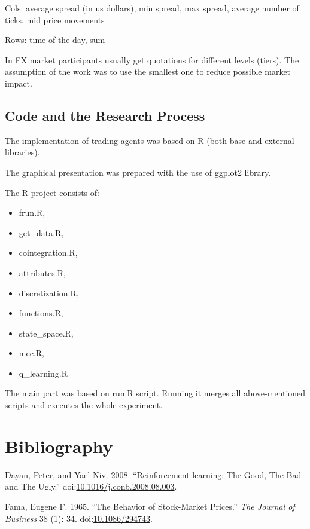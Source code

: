 \documentclass[]{article}
\providecommand{\tightlist}{%
  \setlength{\itemsep}{0pt}\setlength{\parskip}{0pt}}
\begin{document}
Cols: average spread (in us dollars), min spread, max spread, average
number of ticks, mid price movements

Rows: time of the day, sum

In FX market participants usually get quotations for different levels
(tiers). The assumption of the work was to use the smallest one to
reduce possible market impact.

\subsection{Code and the Research
Process}\label{code-and-the-research-process}

The implementation of trading agents was based on R (both base and
external libraries).

The graphical presentation was prepared with the use of ggplot2 library.

The R-project consists of:

\begin{itemize}
\tightlist
\item
  frun.R,
\item
  get\_data.R,
\item
  cointegration.R,
\item
  attributes.R,
\item
  discretization.R,
\item
  functions.R,
\item
  state\_space.R,
\item
  mcc.R,
\item
  q\_learning.R
\end{itemize}

The main part was based on run.R script. Running it merges all
above-mentioned scripts and executes the whole experiment.

\listoffigures

\newpage

\section*{Bibliography}\label{bibliography}

\hypertarget{refs}{}
\hypertarget{ref-Dayan2008}{}
Dayan, Peter, and Yael Niv. 2008. ``Reinforcement learning: The Good,
The Bad and The Ugly.''
doi:\href{https://doi.org/10.1016/j.conb.2008.08.003}{10.1016/j.conb.2008.08.003}.

\hypertarget{ref-Fama1965}{}
Fama, Eugene F. 1965. ``The Behavior of Stock-Market Prices.'' \emph{The
Journal of Business} 38 (1): 34.
doi:\href{https://doi.org/10.1086/294743}{10.1086/294743}.
\end{document}
